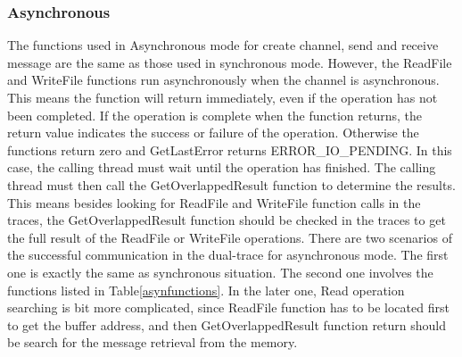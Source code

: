 \subsubsection{Asynchronous}
The functions used in Asynchronous mode for create channel, send and receive message are the same as those used in synchronous mode. However,  the ReadFile and WriteFile functions run asynchronously when the channel is asynchronous. This means the function will return immediately, even if the operation has not been completed. If the operation is complete when the function returns, the return value indicates the success or failure of the operation. Otherwise the functions return zero and GetLastError returns ERROR\_IO\_PENDING. In this case, the calling thread must wait until the operation has finished. The calling thread must then call the GetOverlappedResult function to determine the results. This means besides looking for ReadFile and WriteFile function calls in the traces, the GetOverlappedResult function should be checked in the traces to get the full result of the ReadFile or WriteFile operations. There are two scenarios of the successful communication in the dual-trace for asynchronous mode. The first one is exactly the same as synchronous situation. The second one involves the functions listed in Table\ref{asynfunctions}. In the later one, Read operation searching is bit more complicated, since ReadFile function has to be located first to get the buffer address, and then GetOverlappedResult function return should be search for the message retrieval from the memory.
